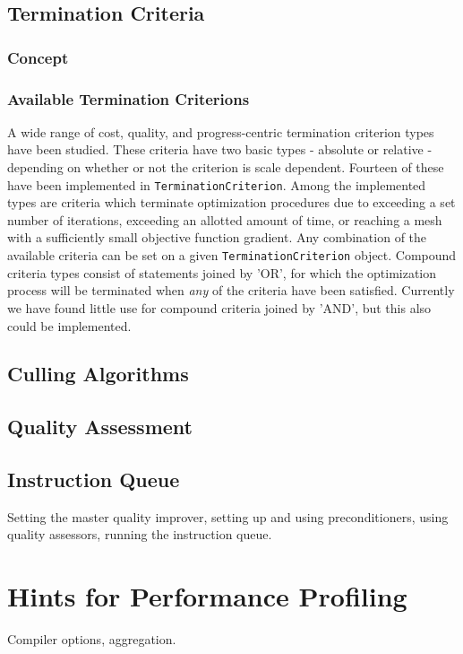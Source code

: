 \documentclass[letter]{report}
\begin{document}
\subsection{Termination Criteria}

\subsubsection{Concept}

\subsubsection{Available Termination Criterions}
A wide range of cost, quality, 
and progress-centric termination
criterion types have been studied. These criteria have two basic types - 
absolute or relative - depending on whether or not the criterion is scale 
dependent.  Fourteen of these have been
implemented in \texttt{TerminationCriterion}.  Among the implemented
types are criteria which terminate optimization procedures due to
exceeding a set number of iterations, exceeding an allotted amount of
time, or reaching a mesh with a sufficiently small objective function
gradient.  Any combination of the available criteria can be set on a given
\texttt{TerminationCriterion} object.  Compound criteria types consist
of statements joined by 'OR', for which 
the optimization process will be terminated when {\it any} of
the criteria have been satisfied.  Currently we have found little use
for compound criteria joined by 'AND', but this also could be implemented. 

\subsection{Culling Algorithms}

\subsection{Quality Assessment}

\subsection{Instruction Queue}
Setting the master quality improver, setting up and using preconditioners,
using quality assessors, running the instruction queue.




\section{Hints for Performance Profiling}
Compiler options, aggregation.
\end{document}
